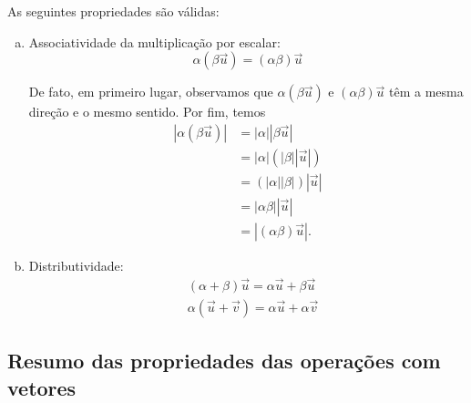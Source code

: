 \begin{obs}
  As seguintes propriedades são válidas:
  \begin{enumerate}[a)]
  \item Associatividade da multiplicação por escalar:
    \begin{equation}
      \alpha\left(\beta\vec{u}\right) = (\alpha\beta)\vec{u}
    \end{equation}

    De fato, em primeiro lugar, observamos que $\alpha\left(\beta\vec{u}\right)$ e $(\alpha\beta)\vec{u}$ têm a mesma direção e o mesmo sentido. Por fim, temos
    \begin{align}
      |\alpha\left(\beta\vec{u}\right)| &= |\alpha||\beta\vec{u}| \\
                                        &= |\alpha|\left(|\beta||\vec{u}|\right) \\
                                        &= \left(|\alpha||\beta|\right)|\vec{u}| \\
                                        &= |\alpha\beta||\vec{u}| \\
                                        &= |(\alpha\beta)\vec{u}|.
    \end{align}
    
  \item Distributividade:
    \begin{align}
      &(\alpha + \beta)\vec{u} = \alpha\vec{u} + \beta\vec{u}\\
      &\alpha\left(\vec{u}+\vec{v}\right) = \alpha\vec{u} + \alpha\vec{v}
    \end{align}
  \end{enumerate}
\end{obs}

\subsection{Resumo das propriedades das operações com vetores}

